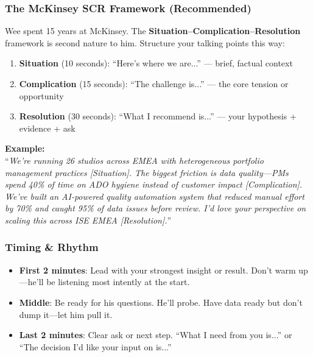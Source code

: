\documentclass[11pt,a4paper]{article}
\begin{document}
\subsubsection{The McKinsey SCR Framework (Recommended)}

Wee spent 15 years at McKinsey. The \textbf{Situation--Complication--Resolution} framework is second nature to him. Structure your talking points this way:

\begin{enumerate}
    \item \textbf{Situation} (10 seconds): ``Here's where we are...'' --- brief, factual context
    \item \textbf{Complication} (15 seconds): ``The challenge is...'' --- the core tension or opportunity
    \item \textbf{Resolution} (30 seconds): ``What I recommend is...'' --- your hypothesis + evidence + ask
\end{enumerate}

\begin{center}
\begin{tcolorbox}[
    colback=mslightgray,
    colframe=msgreen,
    boxrule=0.5pt,
    arc=3pt,
    left=10pt, right=10pt, top=8pt, bottom=8pt,
    width=0.9\textwidth
]
\textbf{Example:}\\
``\textit{We're running 26 studios across EMEA with heterogeneous portfolio management practices [Situation]. The biggest friction is data quality---PMs spend 40\% of time on ADO hygiene instead of customer impact [Complication]. We've built an AI-powered quality automation system that reduced manual effort by 70\% and caught 95\% of data issues before review. I'd love your perspective on scaling this across ISE EMEA [Resolution].}''
\end{tcolorbox}
\end{center}

\subsubsection{Timing \& Rhythm}

\begin{itemize}
    \item \textbf{First 2 minutes}: Lead with your strongest insight or result. Don't warm up---he'll be listening most intently at the start.
    \item \textbf{Middle}: Be ready for his questions. He'll probe. Have data ready but don't dump it---let him pull it.
    \item \textbf{Last 2 minutes}: Clear ask or next step. ``What I need from you is...'' or ``The decision I'd like your input on is...''
\end{itemize}
\end{document}
